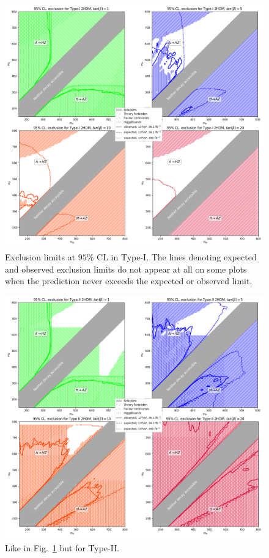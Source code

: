 \begin{figure}[t!]
	\centering
    \includegraphics[width=\textwidth]{single_tbs/type1.png}
    \caption{Exclusion limits at \(95\%\) CL in Type-I.
             The lines denoting expected and observed exclusion limits
             do not appear at all on some plots when the prediction never exceeds the 
             expected or observed  limit.}\label{fig:2HDMparams1}
\end{figure}

\begin{figure}[t!]		
    \includegraphics[width=\textwidth]{single_tbs/type2.png}
    \caption{Like in Fig.~\ref{fig:2HDMparams1} but for Type-II.}\label{fig:2HDMparams2}
\end{figure}


